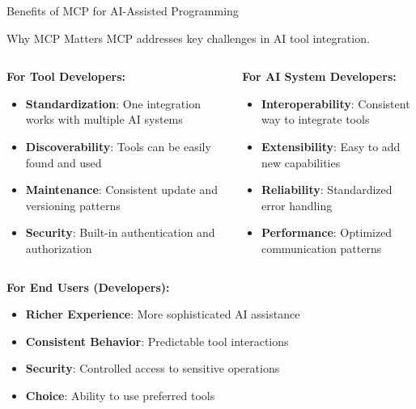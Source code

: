 \documentclass{beamer}
\begin{document}
\begin{frame}[t]{Benefits of MCP for AI-Assisted Programming}
    \begin{block}{Why MCP Matters}
        MCP addresses key challenges in AI tool integration.
    \end{block}
    
    \begin{columns}[t]
        \begin{column}{0.5\textwidth}
            \textbf{For Tool Developers:}
            \begin{itemize}
                \item \textbf{Standardization}: One integration works with multiple AI systems
                \item \textbf{Discoverability}: Tools can be easily found and used
                \item \textbf{Maintenance}: Consistent update and versioning patterns
                \item \textbf{Security}: Built-in authentication and authorization
            \end{itemize}
        \end{column}
        \begin{column}{0.5\textwidth}
            \textbf{For AI System Developers:}
            \begin{itemize}
                \item \textbf{Interoperability}: Consistent way to integrate tools
                \item \textbf{Extensibility}: Easy to add new capabilities
                \item \textbf{Reliability}: Standardized error handling
                \item \textbf{Performance}: Optimized communication patterns
            \end{itemize}
        \end{column}
    \end{columns}
    
    \vspace{0.3cm}
    \textbf{For End Users (Developers):}
    \begin{itemize}
        \item \textbf{Richer Experience}: More sophisticated AI assistance
        \item \textbf{Consistent Behavior}: Predictable tool interactions
        \item \textbf{Security}: Controlled access to sensitive operations
        \item \textbf{Choice}: Ability to use preferred tools
    \end{itemize}
\end{frame}
\end{document}
